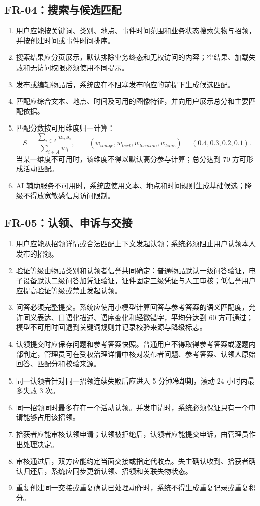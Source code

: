 \subsection{FR-04：搜索与候选匹配}

\begin{enumerate}
  \item 用户应能按关键词、类别、地点、事件时间范围和业务状态搜索失物与招领，并按创建时间或事件时间排序。
  \item 搜索结果应分页展示，默认排除业务终态和无权访问的内容；空结果、加载失败和无访问权限必须使用不同提示。
  \item 发布或编辑物品后，系统应在不阻塞发布响应的前提下生成候选匹配。
  \item 匹配应综合文本、地点、时间及可用的图像特征，并向用户展示总分和主要匹配依据。
  \item 匹配分数按可用维度归一计算：
  \[
    S=\frac{\sum_{i\in A}w_i s_i}{\sum_{i\in A}w_i},\qquad
    (w_{image},w_{text},w_{location},w_{time})=(0.4,0.3,0.2,0.1).
  \]
  当某一维度不可用时，该维度不得以默认高分参与计算；总分达到 70 方可形成活动匹配。
  \item AI 辅助服务不可用时，系统应使用文本、地点和时间规则生成基础候选；降级不得放宽敏感信息访问限制。
\end{enumerate}

\subsection{FR-05：认领、申诉与交接}

\begin{enumerate}
  \item 用户应能从招领详情或合法匹配上下文发起认领；系统必须阻止用户认领本人发布的招领。
  \item 验证等级由物品类别和认领者信誉共同确定：普通物品默认一级问答验证，电子设备默认二级问答加凭证验证，证件固定三级凭证与人工审核；低信誉用户应提高验证等级或禁止发起认领。
  \item 问答必须完整提交。系统应使用小模型计算回答与参考答案的语义匹配度，允许同义表达、口语化描述、语序变化和轻微错字，平均分达到 60 方可通过；模型不可用时回退到关键词规则并记录校验来源与降级标志。
  \item 认领提交时应保存问题和参考答案快照。普通用户不得取得参考答案或逐题内部判定，管理员可在受权治理详情中核对发布者问题、参考答案、认领人原始回答、匹配分和校验来源。
  \item 同一认领者针对同一招领连续失败后应进入 5 分钟冷却期，滚动 24 小时内最多失败 3 次。
  \item 同一招领同时最多存在一个活动认领。并发申请时，系统必须保证只有一个申请能够占用该招领。
  \item 拾获者应能审核认领申请；认领被拒绝后，认领者应能提交申诉，由管理员作出处理决定。
  \item 审核通过后，双方应能约定当面交接或指定代收点。失主确认收到、拾获者确认归还后，系统应同步更新认领、招领和关联失物状态。
  \item 重复创建同一交接或重复确认已处理动作时，系统不得生成重复记录或重复积分。
\end{enumerate}


